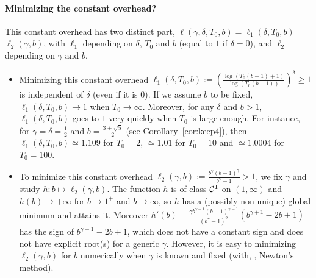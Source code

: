 \documentclass[12pt]{colt2018} %
\begin{document}
\paragraph{Minimizing the constant overhead?}
%
This constant overhead has two distinct part,
$\ell(\gamma, \delta, T_0, b) = \ell_1(\delta, T_0, b)$ $\ell_2(\gamma, b)$,
with $\ell_1$ depending on $\delta$, $T_0$ and $b$ (equal to $1$ if $\delta=0$),
and $\ell_2$ depending on $\gamma$ and $b$.
\begin{itemize}
    \item
Minimizing this constant overhead $\ell_1(\delta, T_0, b) := \left(\frac{\log(T_0 (b-1) + 1)}{\log(T_0 (b-1))} \right)^{\delta}\geq 1$ is independent of $\delta$ (even if it is $0$).
If we assume $b$ to be fixed,
$\ell_1(\delta, T_0, b) \to 1$ when $T_0\to\infty$.
Moreover, for any $\delta$ and $b>1$,
$\ell_1(\delta, T_0, b)$ goes to $1$ very quickly when $T_0$ is large enough.
For instance, for $\gamma=\delta=\frac{1}{2}$ and $b=\frac{3+\sqrt{5}}{2}$ (see Corollary~\ref{cor:keep4}),
then $\ell_1(\delta, T_0, b) \simeq 1.109$ for $T_0=2$, $\simeq 1.01$ for $T_0=10$ and $\simeq 1.0004$ for $T_0=100$.
    \item
To minimize this constant overhead $\ell_2(\gamma, b) := \frac{b^{\gamma} (b - 1)^{\gamma}}{b^{\gamma} - 1} > 1$, we fix $\gamma$ and study $h: b \mapsto \ell_2(\gamma, b)$.
The function $h$ is of class $\mathcal{C}^1$ on $(1, \infty)$ and $h(b) \to +\infty$ for $b\to 1^+$ and $b\to\infty$,
so $h$ has a (possibly non-unique) global minimum and attains it.
Moreover $h'(b) = \frac{\gamma b^{\gamma-1} (b-1)^{\gamma-1}}{(b^{\gamma}-1)^2} \left( b^{\gamma+1} - 2 b + 1 \right)$ has the sign of $b^{\gamma+1} - 2 b + 1$,
which does not have a constant sign and does not have explicit root(s) for a generic $\gamma$.
%
However, it is easy to minimizing $\ell_2(\gamma, b)$ for $b$ numerically when $\gamma$ is known and fixed (with, \eg, Newton's method).
\end{itemize}

\end{document}

